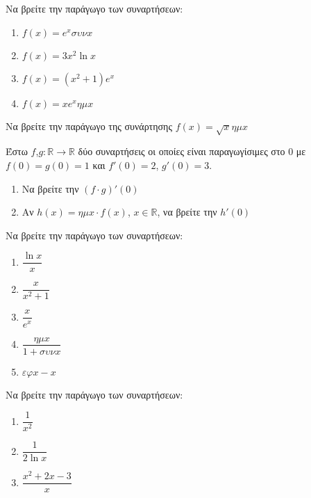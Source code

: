 \documentclass{presentation}
\begin{document}
\begin{askisi}
    Να βρείτε την παράγωγο των συναρτήσεων:
    \begin{enumerate}
        \item<1-> $f(x)=e^xσυνx$
        \item<2-> $f(x)=3x^2\ln x$
        \item<3-> $f(x)=(x^2+1)e^x$
        \item<4-> $f(x)=xe^xημx$
    \end{enumerate}

\end{askisi}

\begin{askisi}
    Να βρείτε την παράγωγο της συνάρτησης $f(x)=\sqrt{x}ημx$

\end{askisi}

\begin{askisi}
    Έστω $f$,$g:\mathbb{R}\to\mathbb{R}$ δύο συναρτήσεις οι οποίες είναι παραγωγίσιμες στο $0$ με $f(0)=g(0)=1$ και $f'(0)=2$, $g'(0)=3$.

    \begin{enumerate}
        \item<1-> Να βρείτε την $(f\cdot g)'(0)$
        \item<2-> Αν $h(x)=ημx \cdot f(x)$, $x\in\mathbb{R}$, να βρείτε την $h'(0)$
    \end{enumerate}

\end{askisi}

\begin{askisi}
    Να βρείτε την παράγωγο των συναρτήσεων:
    \begin{enumerate}
        \item<1-> $\dfrac{\ln x}{x}$
        \item<2-> $\dfrac{x}{x^2+1}$
        \item<3-> $\dfrac{x}{e^x}$
        \item<4-> $\dfrac{ημx}{1+συνx}$
        \item<5-> $εφx-x$
    \end{enumerate}

\end{askisi}

\begin{askisi}
    Να βρείτε την παράγωγο των συναρτήσεων:
    \begin{enumerate}
        \item<1-> $\dfrac{1}{x^2}$
        \item<2-> $\dfrac{1}{2\ln x}$
        \item<3-> $\dfrac{x^2+2x-3}{x}$
    \end{enumerate}

\end{askisi}
\end{document}
